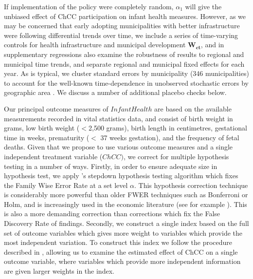 \documentclass[12pt]{article}
\begin{document}
\begin{spacing}{1.4}
If implementation of the policy were completely random,
$\alpha_1$ will give the unbiased effect of ChCC participation on
infant health measures.  However, as we may be concerned that
early adopting municipalities with better infrastructure were
following differential trends over time, we include
a series of time-varying controls for health infrastructure
and municipal development $\bm{W_{ct}}$, and in supplementary
regressions also examine the robustness of results to regional
and municipal time trends, and separate regional and municipal
fixed effects for each year. %
As is typical, we cluster standard errors by municipality
(346 municipalities) to account for the well-known time-dependence
in unobserved stochastic errors by geographic area
\citep{Bertrandetal2004,CameronMiller2015}.  We discuss a number
of additional placebo checks below.

Our principal outcome measures of $InfantHealth$ are based on
the available measurements recorded in vital statistics data,
and consist of birth weight in grams, low birth weight
($<$2,500 grams), birth length in centimetres, gestational time
in weeks, prematurity ($<$ 37 weeks gestation), and the frequency
of fetal deaths.  Given that we propose to use various outcome
measures and a single independent treatment variable ($ChCC)$, we
correct for multiple hypothesis testing in a number of ways.
Firstly, in order to ensure adequate size in hypothesis test, we
apply \citet{RomanoWolf2005}'s stepdown hypothesis
testing algorithm which fixes the Family Wise Error Rate at a set
level $\alpha$.  This hypothesis correction technique is considerably
more powerful than older FWER techniques such as Bonferroni or Holm,
and is increasingly used in the economic literature (see for example
\citet{Gertler2014}).  This is also a more demanding correction than
corrections which fix the False Discovery Rate of findings.
Secondly, we construct a single index based on the full set of
outcome variables which gives more weight to variables which
provide the most independent variation.  To construct this index
we follow the procedure described in \citet{Anderson2008}, allowing
us to examine the estimated effect of ChCC on a single outcome
variable, where variables which provide more independent
information are given larger weights in the index.


\end{spacing}
\end{document}
